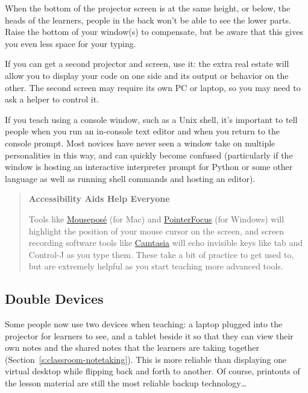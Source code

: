 When the bottom of the projector screen is at the same height, or below,
the heads of the learners, people in the back won't be able to see the
lower parts. Raise the bottom of your window(s) to compensate, but be
aware that this gives you even less space for your typing.

If you can get a second projector and screen, use it: the extra real
estate will allow you to display your code on one side and its output or
behavior on the other. The second screen may require its own PC or
laptop, so you may need to ask a helper to control it.

If you teach using a console window, such as a Unix shell, it's
important to tell people when you run an in-console text editor and when
you return to the console prompt. Most novices have never seen a window
take on multiple personalities in this way, and can quickly become
confused (particularly if the window is hosting an interactive
interpreter prompt for Python or some other language as well as running
shell commands and hosting an editor).

\begin{quote}\setlength{\parindent}{0pt}
\textbf{Accessibility Aids Help Everyone}

Tools like \href{https://boinx.com/mousepose/overview/}{Mousepos\'{e}} (for Mac) and
\href{http://www.pointerfocus.com/}{PointerFocus} (for Windows) will highlight the
position of your mouse cursor on the screen, and screen recording
software tools like \href{https://www.techsmith.com/video-editor.html}{Camtasia} will echo invisible keys
like tab and Control-J as you type them. These take a bit of
practice to get used to, but are extremely helpful as you start
teaching more advanced tools.
\end{quote}

\subsection{Double Devices}\label{double-devices}

Some people now use two devices when teaching: a laptop plugged into the
projector for learners to see, and a tablet beside it so that they can
view their own notes and the shared notes that the learners are taking
together (Section~\ref{s:classroom-notetaking}). This is more reliable
than displaying one virtual desktop while flipping back and forth to
another. Of course, printouts of the lesson material are still the most
reliable backup technology\ldots{}

